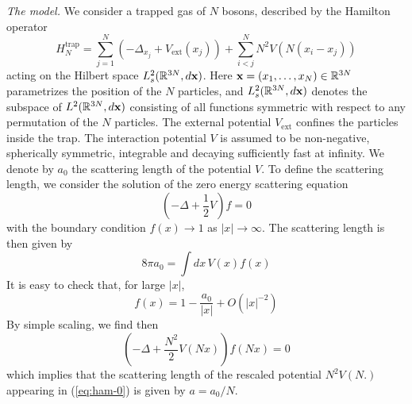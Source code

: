 \documentclass[11pt,a4paper,DIV11]{scrartcl}	%
\newcommand{\bx}{{\bf x}}
\newcommand{\bR}{{\mathbb R}}
\begin{document}
\bigskip

{\it The model.} We consider a trapped gas of $N$ bosons, described by the Hamilton operator 
\begin{equation}\label{eq:ham-0}
H^{\text{trap}}_N = \sum_{j=1}^N \left(-\Delta_{x_j} +V_{\text{ext}} (x_j)\right) + \sum_{i<j}^N N^2 V (N (x_i - x_j)) 
\end{equation}
acting on the Hilbert space $L^2_s (\bR^{3N}, d\bx)$. Here $\bx = (x_1, \dots , x_N) \in \bR^{3N}$ parametrizes the position of the $N$ particles, and $L^2_s (\bR^{3N}, d\bx)$ denotes the subspace of $L^2 (\bR^{3N}, d\bx)$ consisting of all functions symmetric with respect to any permutation of the $N$ particles. The external potential $V_{\text{ext}}$ confines the particles inside the trap. The interaction potential $V$ is assumed to be non-negative, spherically symmetric,  integrable and decaying sufficiently fast at infinity. We denote by $a_0$ the scattering length of the potential $V$. To define the scattering length, we consider the solution of the zero energy scattering equation 
\begin{equation}\label{eq:0en-0} \left( -\Delta + \frac{1}{2} V \right) f = 0 \end{equation}
with the boundary condition $f (x) \to 1$ as $|x| \to \infty$. The scattering length is then given by 
\begin{equation}\label{eq:8pia} 8 \pi a_0 = \int dx \, V(x) f(x) \end{equation}
It is easy to check that, for large $|x|$, 
\begin{equation}\label{eq:f} f(x) = 1- \frac{a_0}{|x|} + O (|x|^{-2}) \end{equation}
By simple scaling, we find then
\[ \left( -\Delta + \frac{N^2}{2} V(N x) \right) f (Nx) = 0 \]
which implies that the scattering length of the rescaled potential $N^2 V(N.)$ appearing in (\ref{eq:ham-0}) is given by $a=a_0/N$. 

\bigskip
\end{document}
